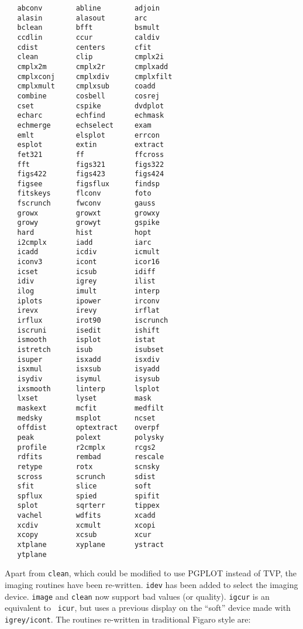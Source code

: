 \begin{verbatim}
   abconv        abline        adjoin   
   alasin        alasout       arc      
   bclean        bfft          bsmult   
   ccdlin        ccur          caldiv   
   cdist         centers       cfit     
   clean         clip          cmplx2i  
   cmplx2m       cmplx2r       cmplxadd 
   cmplxconj     cmplxdiv      cmplxfilt
   cmplxmult     cmplxsub      coadd    
   combine       cosbell       cosrej   
   cset          cspike        dvdplot  
   echarc        echfind       echmask  
   echmerge      echselect     exam     
   emlt          elsplot       errcon   
   esplot        extin         extract  
   fet321        ff            ffcross  
   fft           figs321       figs322  
   figs422       figs423       figs424  
   figsee        figsflux      findsp   
   fitskeys      flconv        foto          
   fscrunch      fwconv        gauss    
   growx         growxt        growxy   
   growy         growyt        gspike   
   hard          hist          hopt     
   i2cmplx       iadd          iarc     
   icadd         icdiv         icmult   
   iconv3        icont         icor16   
   icset         icsub         idiff    
   idiv          igrey         ilist    
   ilog          imult         interp   
   iplots        ipower        irconv   
   irevx         irevy         irflat   
   irflux        irot90        iscrunch 
   iscruni       isedit        ishift   
   ismooth       isplot        istat    
   istretch      isub          isubset  
   isuper        isxadd        isxdiv   
   isxmul        isxsub        isyadd   
   isydiv        isymul        isysub   
   ixsmooth      linterp       lsplot        
   lxset         lyset         mask     
   maskext       mcfit         medfilt  
   medsky        msplot        ncset    
   offdist       optextract    overpf   
   peak          polext        polysky  
   profile       r2cmplx       rcgs2    
   rdfits        rembad        rescale  
   retype        rotx          scnsky   
   scross        scrunch       sdist    
   sfit          slice         soft     
   spflux        spied         spifit   
   splot         sqrterr       tippex   
   vachel        wdfits        xcadd    
   xcdiv         xcmult        xcopi    
   xcopy         xcsub         xcur     
   xtplane       xyplane       ystract  
   ytplane  
\end{verbatim}

Apart from {\tt clean}, which could be modified to use PGPLOT instead of
TVP, the imaging routines have been re-written.  {\tt idev} has been
added to select the imaging device.  {\tt image} and {\tt clean} now
support bad values (or quality).  {\tt igcur} is an equivalent to {\tt
icur}, but uses a previous display on the ``soft'' device made with {\tt
igrey/icont}.  The routines re-written in traditional Figaro style are:

